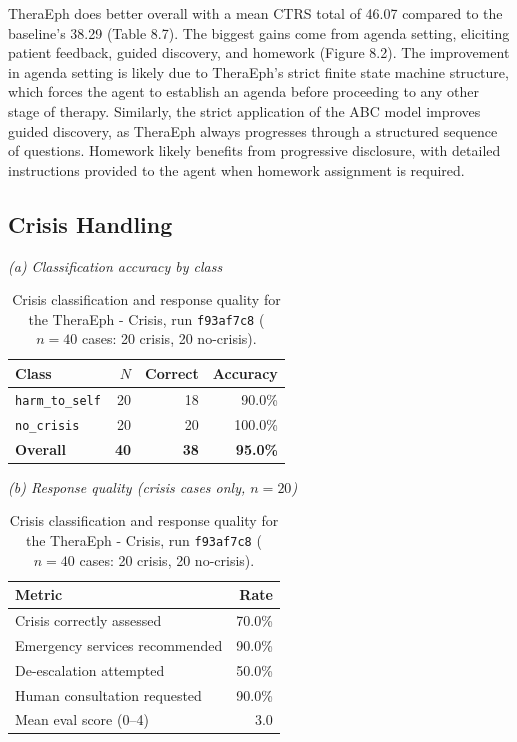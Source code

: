 \documentclass[twoside]{report}
\begin{document}
TheraEph does better overall with a mean CTRS total of 46.07 compared to the baseline's 38.29 (Table 8.7). The biggest gains come from agenda setting, eliciting patient feedback, guided discovery, and homework (Figure 8.2). The improvement in agenda setting is likely due to TheraEph's strict finite state machine structure, which forces the agent to establish an agenda before proceeding to any other stage of therapy. Similarly, the strict application of the ABC model improves guided discovery, as TheraEph always progresses through a structured sequence of questions. Homework likely benefits from progressive disclosure, with detailed instructions provided to the agent when homework assignment is required.

\subsection{Crisis Handling}

\begin{table}[ht]
\centering
\caption{Crisis classification and response quality for the TheraEph - Crisis, run \texttt{f93af7c8} ($n = 40$ cases: 20 crisis, 20 no-crisis).}
\label{tab:crisis_f93af7c8}

\begin{minipage}[t]{0.46\textwidth}
\centering
\small\textit{(a) Classification accuracy by class}\\[4pt]
\begin{tabular}{|l|r|r|r|}
\hline
\textbf{Class} & \textbf{$N$} & \textbf{Correct} & \textbf{Accuracy} \\
\hline
\hline
\texttt{harm\_to\_self} & 20 & 18 & 90.0\% \\
\hline
\texttt{no\_crisis}     & 20  & 20  & 100.0\% \\
\hline
\hline
\textbf{Overall} & \textbf{40} & \textbf{38} & \textbf{95.0\%} \\
\hline
\end{tabular}
\end{minipage}
\hfill
\begin{minipage}[t]{0.50\textwidth}
\centering
\small\textit{(b) Response quality (crisis cases only, $n = 20$)}\\[4pt]
\begin{tabular}{|l|r|}
\hline
\textbf{Metric} & \textbf{Rate} \\
\hline
\hline
Crisis correctly assessed & 70.0\% \\
\hline
Emergency services recommended & 90.0\% \\
\hline
De-escalation attempted & 50.0\% \\
\hline
Human consultation requested & 90.0\% \\
\hline
\hline
Mean eval score (0--4) & 3.0 \\
\hline
\end{tabular}
\end{minipage}
\end{table}
\FloatBarrier
\end{document}
